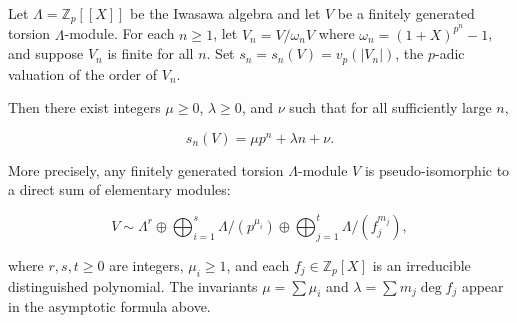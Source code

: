 Let $\Lambda = \mathbb{Z}_p[[X]]$ be the Iwasawa algebra and let $V$ be a finitely generated torsion $\Lambda$-module. For each $n \geq 1$, let $V_n = V/\omega_n V$ where $\omega_n = (1 + X)^{p^n} - 1$, and suppose $V_n$ is finite for all $n$. Set $s_n = s_n(V) = v_p(|V_n|)$, the $p$-adic valuation of the order of $V_n$.

Then there exist integers $\mu \geq 0$, $\lambda \geq 0$, and $\nu$ such that for all sufficiently large $n$,

$$s_n(V) = \mu p^n + \lambda n + \nu.$$

More precisely, any finitely generated torsion $\Lambda$-module $V$ is pseudo-isomorphic to a direct sum of elementary modules:

$$V \sim \Lambda^r \oplus \bigoplus_{i=1}^{s} \Lambda/(p^{\mu_i}) \oplus \bigoplus_{j=1}^{t} \Lambda/(f_j^{m_j}),$$

where $r, s, t \geq 0$ are integers, $\mu_i \geq 1$, and each $f_j \in \mathbb{Z}_p[X]$ is an irreducible distinguished polynomial. The invariants $\mu = \sum \mu_i$ and $\lambda = \sum m_j \deg f_j$ appear in the asymptotic formula above.
